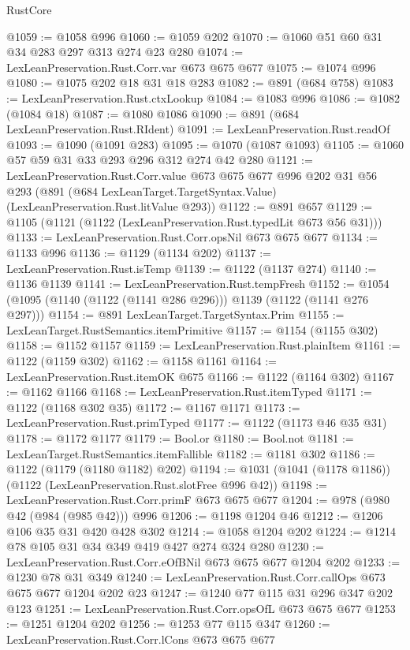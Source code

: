 \begin{lexlean}{RustCore}
\begin{coremodule}
@1059 := @1058 @996
@1060 := @1059 @202
@1070 := @1060 @51 @60 @31 @34 @283 @297 @313 @274 @23 @280
@1074 := LexLeanPreservation.Rust.Corr.var @673 @675 @677
@1075 := @1074 @996
@1080 := @1075 @202 @18 @31 @18 @283
@1082 := @891 (@684 @758)
@1083 := LexLeanPreservation.Rust.ctxLookup
@1084 := @1083 @996
@1086 := @1082 (@1084 @18)
@1087 := @1080 @1086
@1090 := @891 (@684 LexLeanPreservation.Rust.RIdent)
@1091 := LexLeanPreservation.Rust.readOf
@1093 := @1090 (@1091 @283)
@1095 := @1070 (@1087 @1093)
@1105 := @1060 @57 @59 @31 @33 @293 @296 @312 @274 @42 @280
@1121 := LexLeanPreservation.Rust.Corr.value
    @673
    @675
    @677
    @996
    @202
    @31
    @56
    @293
    (@891 (@684 LexLeanTarget.TargetSyntax.Value) (LexLeanPreservation.Rust.litValue @293))
@1122 := @891 @657
@1129 := @1105 (@1121 (@1122 (LexLeanPreservation.Rust.typedLit @673 @56 @31)))
@1133 := LexLeanPreservation.Rust.Corr.opsNil @673 @675 @677
@1134 := @1133 @996
@1136 := @1129 (@1134 @202)
@1137 := LexLeanPreservation.Rust.isTemp
@1139 := @1122 (@1137 @274)
@1140 := @1136 @1139
@1141 := LexLeanPreservation.Rust.tempFresh
@1152 := @1054 (@1095 (@1140 (@1122 (@1141 @286 @296))) @1139 (@1122 (@1141 @276 @297)))
@1154 := @891 LexLeanTarget.TargetSyntax.Prim
@1155 := LexLeanTarget.RustSemantics.itemPrimitive
@1157 := @1154 (@1155 @302)
@1158 := @1152 @1157
@1159 := LexLeanPreservation.Rust.plainItem
@1161 := @1122 (@1159 @302)
@1162 := @1158 @1161
@1164 := LexLeanPreservation.Rust.itemOK @675
@1166 := @1122 (@1164 @302)
@1167 := @1162 @1166
@1168 := LexLeanPreservation.Rust.itemTyped
@1171 := @1122 (@1168 @302 @35)
@1172 := @1167 @1171
@1173 := LexLeanPreservation.Rust.primTyped
@1177 := @1122 (@1173 @46 @35 @31)
@1178 := @1172 @1177
@1179 := Bool.or
@1180 := Bool.not
@1181 := LexLeanTarget.RustSemantics.itemFallible
@1182 := @1181 @302
@1186 := @1122 (@1179 (@1180 @1182) @202)
@1194 := @1031 (@1041 (@1178 @1186)) (@1122 (LexLeanPreservation.Rust.slotFree @996 @42))
@1198 := LexLeanPreservation.Rust.Corr.primF @673 @675 @677
@1204 := @978 (@980 @42 (@984 (@985 @42))) @996
@1206 := @1198 @1204 @46
@1212 := @1206 @106 @35 @31 @420 @428 @302
@1214 := @1058 @1204 @202
@1224 := @1214 @78 @105 @31 @34 @349 @419 @427 @274 @324 @280
@1230 := LexLeanPreservation.Rust.Corr.eOfBNil @673 @675 @677 @1204 @202
@1233 := @1230 @78 @31 @349
@1240 := LexLeanPreservation.Rust.Corr.callOps @673 @675 @677 @1204 @202 @23
@1247 := @1240 @77 @115 @31 @296 @347 @202 @123
@1251 := LexLeanPreservation.Rust.Corr.opsOfL @673 @675 @677
@1253 := @1251 @1204 @202
@1256 := @1253 @77 @115 @347
@1260 := LexLeanPreservation.Rust.Corr.lCons @673 @675 @677

\end{coremodule}
\end{lexlean}
